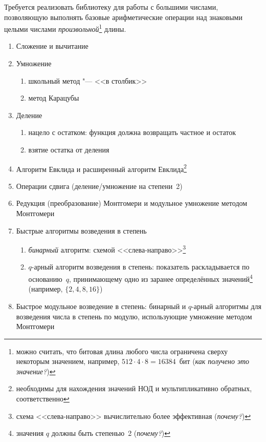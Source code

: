 \documentclass{ca-capstone}
\begin{document}


\goal
Требуется реализовать библиотеку для работы с большими числами, позволяющую выполнять базовые
арифметические операции над знаковыми целыми числами
\emph{произвольной}\footnote{можно считать, что битовая длина любого числа ограничена сверху
некоторым значением, например, $512 \cdot 4 \cdot 8 = 16384$~бит (\emph{как получено это
значение?})} длины.

\functionality
\begin{enumerate}
  \item Сложение и вычитание
  \item Умножение
    \begin{enumerate}[label=\alph*.]
      \item школьный метод "--- <<в столбик>>
      \item метод Карацубы
    \end{enumerate}
  \item Деление
    \begin{enumerate}[label=\alph*.]
      \item нацело с остатком: функция должна возвращать частное и остаток
      \item взятие остатка от деления
    \end{enumerate}
  \item Алгоритм Евклида и расширенный алгоритм Евклида\footnote{необходимы для нахождения
    значений НОД и мультипликативно обратных, соответственно}
  \item Операции сдвига (деление/умножение на степени~2)
  \item Редукция (преобразование) Монтгомери и модульное умножение методом Монтгомери
  \item Быстрые алгоритмы возведения в степень
    \begin{enumerate}[label=\alph*.]
      \item \emph{бинарный} алгоритм: схемой <<слева-направо>>\footnote{схема
        <<слева-направо>> вычислительно более эффективная (\emph{почему?})}
      \item $q$-арный алгоритм возведения в степень: показатель раскладывается по
        основанию~$q$, принимающему одно из заранее определённых
        значений\footnote{значения $q$ должны быть степенью~2 (\emph{почему?})} (например,
        $\{2, 4, 8, 16\}$)
    \end{enumerate}
  \item Быстрое модульное возведение в степень: бинарный и $q$-арный алгоритмы для возведения
    числа в степень по модулю, использующие умножение методом Монтгомери
\end{enumerate}
\end{document}

